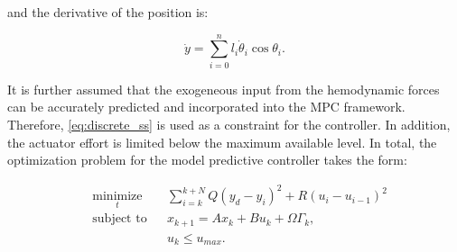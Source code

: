 \documentclass[letterpaper,10pt,conference]{ieeeconf}   %
\begin{document}
and the derivative of the position is:

\begin{equation}
\label{eq:y-dot-output}
\dot{y} = \sum_{i=0}^n l_i \dot{\theta}_i \cos{\theta_i}. 
\end{equation}

It is further assumed that the exogeneous input from the hemodynamic forces can be accurately predicted and incorporated into the MPC framework. Therefore, \eqref{eq:discrete_ss} is used as a constraint for the controller. In addition, the actuator effort is limited below the maximum available level. In total, the optimization problem for the model predictive controller takes the form:

\begin{equation}
\begin{aligned}
\label{eq:posconstraints}
& \underset{t}{\text{minimize}}
& &  \sum_{i=k}^{k+N} Q (y_d - y_i)^2 + R (u_i - u_{i-1})^2\\
& \text{subject to}
& & x_{k+1} = A x_k + B u_k + \Omega \Gamma_k,\\
&&&  u_k \leq u_{max}.\\
\end{aligned}
\end{equation}




\end{document}

